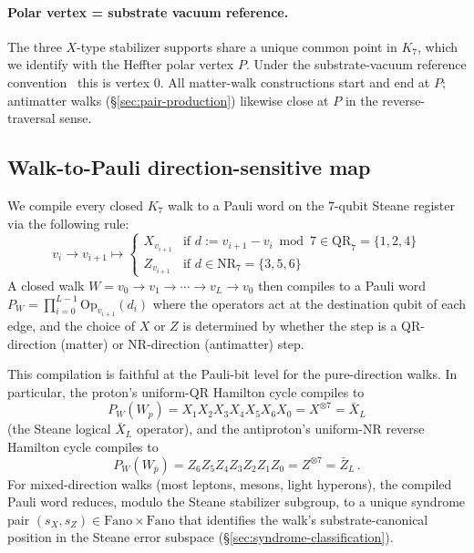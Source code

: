 \documentclass[11pt]{article}
\newcommand{\barX}{\bar X_L}
\newcommand{\barZ}{\bar Z_L}
\newcommand{\QR}{\mathrm{QR}}
\newcommand{\NR}{\mathrm{NR}}
\begin{document}
\paragraph{Polar vertex = substrate vacuum reference.}
The three $X$-type stabilizer supports share a unique common point in $K_7$, which we identify with the Heffter polar vertex $P$.  Under the substrate-vacuum reference convention~\cite{BogoliubovPipeline} this is vertex $0$.  All matter-walk constructions start and end at $P$; antimatter walks (\S\ref{sec:pair-production}) likewise close at $P$ in the reverse-traversal sense.

\subsection{Walk-to-Pauli direction-sensitive map}
\label{sec:walk-to-pauli}

We compile every closed $K_7$ walk to a Pauli word on the $7$-qubit Steane register via the following rule:
\begin{equation}
  \label{eq:walk-to-pauli}
  v_i \to v_{i + 1} \mapsto \begin{cases}
    X_{v_{i + 1}} & \text{if } d := v_{i + 1} - v_i \bmod 7 \in \QR_7 = \{1, 2, 4\} \\
    Z_{v_{i + 1}} & \text{if } d \in \NR_7 = \{3, 5, 6\}
  \end{cases}
\end{equation}
A closed walk $W = v_0 \to v_1 \to \cdots \to v_L \to v_0$ then compiles to a Pauli word $P_W = \prod_{i = 0}^{L - 1} \mathrm{Op}_{v_{i + 1}}(d_i)$ where the operators act at the destination qubit of each edge, and the choice of $X$ or $Z$ is determined by whether the step is a QR-direction (matter) or NR-direction (antimatter) step.

This compilation is faithful at the Pauli-bit level for the pure-direction walks.  In particular, the proton's uniform-QR Hamilton cycle compiles to
\begin{equation}
  P_W(W_p) = X_1 X_2 X_3 X_4 X_5 X_6 X_0 = X^{\otimes 7} = \barX
\end{equation}
(the Steane logical $\bar X_L$ operator), and the antiproton's uniform-NR reverse Hamilton cycle compiles to
\begin{equation}
  P_W(W_{\bar p}) = Z_6 Z_5 Z_4 Z_3 Z_2 Z_1 Z_0 = Z^{\otimes 7} = \barZ \, .
\end{equation}
For mixed-direction walks (most leptons, mesons, light hyperons), the compiled Pauli word reduces, modulo the Steane stabilizer subgroup, to a unique syndrome pair $(s_X, s_Z) \in \mathrm{Fano} \times \mathrm{Fano}$ that identifies the walk's substrate-canonical position in the Steane error subspace (\S\ref{sec:syndrome-classification}).
\end{document}
